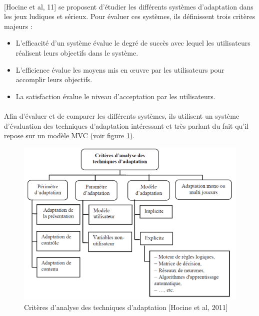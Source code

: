 \paragraph{}
[Hocine et al, 11] se proposent d'étudier les différents systèmes d'adaptation dans les jeux ludiques et sérieux. Pour évaluer ces systèmes, ils définissent trois critères majeurs :
\begin{itemize}
	\item L’efficacité d’un système évalue le degré de succès avec lequel les utilisateurs réalisent leurs objectifs dans le système.
	\item L’efficience évalue les moyens mis en œuvre par les utilisateurs pour accomplir leurs objectifs.
	\item La satisfaction évalue le niveau d’acceptation par les utilisateurs.
\end{itemize}

\paragraph{}
Afin d'évaluer et de comparer les différents systèmes, ils utilisent un système d'évaluation des techniques d'adaptation intéressant et très parlant du fait qu'il repose sur un modèle MVC (voir figure \ref{criteres_adaptation}).

\begin{figure}[!hbtp]
	\centering
	\includegraphics[width=1\linewidth]{images/criteres_adaptation.png}
	\caption{Critères d’analyse des techniques d’adaptation [Hocine et al, 2011]\cite{Hoci11}}
	\label{criteres_adaptation}
\end{figure}

